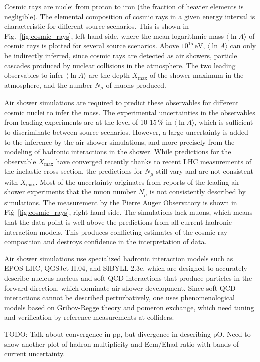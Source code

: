 \documentclass[../report.tex]{subfiles}
\newcommand{\mlna}{\langle \ln\!A \rangle}
\newcommand{\nmu}{N_\mu}
\newcommand{\xmax}{X_\text{max}}
\newcommand{\si}[1]{\ensuremath{\text{#1}}}
\begin{document}
Cosmic rays are nuclei from proton to iron (the fraction of heavier elements is negligible). The elemental composition of cosmic rays in a given energy interval is characteristic for different source scenarios. This is shown in Fig.~\ref{fig:cosmic_rays}, left-hand-side, where the mean-logarithmic-mass $\mlna$ of cosmic rays is plotted for several source scenarios. Above $10^{15}$\,\si{eV}, $\mlna$ can only be indirectly inferred, since cosmic rays are detected as air showers, particle cascades produced by nuclear collisions in the atmosphere. The two leading observables to infer $\mlna$ are the depth $\xmax$ of the shower maximum in the atmosphere, and the number $\nmu$ of muons produced.

Air shower simulations are required to predict these observables for different cosmic nuclei to infer the mass. The experimental uncertainties in the observables from leading experiments are at the level of 10-15\,\% in $\mlna$, which is sufficient to discriminate between source scenarios. However, a large uncertainty is added to the inference by the air shower simulations, and more precisely from the modeling of hadronic interactions in the shower. While predictions for the observable $\xmax$ have converged recently thanks to recent LHC measurements of the inelastic cross-section, the predictions for $\nmu$ still vary and are not consistent with $\xmax$. Most of the uncertainty originates from reports of the leading air shower experiments\cite{Aab:2014pza,Dembinski:2017zkb,Kokoulin:2009zz,AbuZayyad:1999xa,Aab:2014dua} that the muon number $\nmu$ is not consistently described by simulations. The measurement by the Pierre Auger Observatory is shown in Fig\.~\ref{fig:cosmic_rays}, right-hand-side. The simulations lack muons, which means that the data point is well above the predictions from all current hadronic interaction models. This produces conflicting estimates of the cosmic ray composition and destroys confidence in the interpretation of data.

Air shower simulations use specialized hadronic interaction models such as EPOS-LHC\cite{Werner:2005jf}, \mbox{QGSJet-II.04}\cite{Ostapchenko:2010vb}, and SIBYLL-2.3c\cite{Riehn:2017mfm}, which are designed to accurately describe nucleus-nucleus and soft-QCD interactions that produce particles in the forward direction, which dominate air-shower development. Since soft-QCD interactions cannot be described perturbatively, one uses phenomenological models based on Gribov-Regge theory and pomeron exchange, which need tuning and verification by reference measurements at colliders.

TODO: Talk about convergence in pp, but divergence in describing pO. Need to show another plot of hadron multiplicity and Eem/Ehad ratio with bands of current uncertainty.
\end{document}
